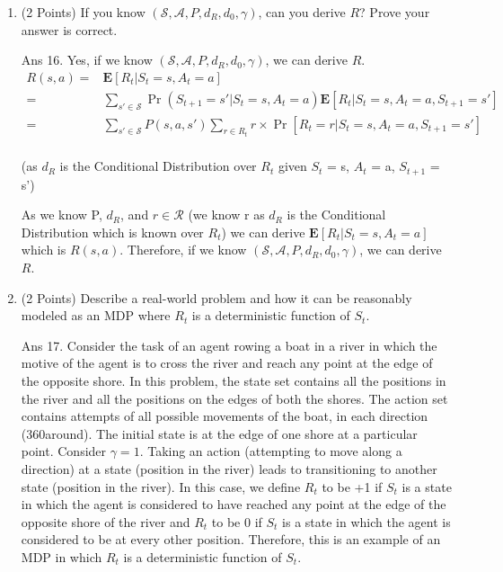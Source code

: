 \documentclass[]{article}
\begin{document}
\begin{enumerate}
    \item (2 Points) If you know $(\mathcal S, \mathcal A, P, d_R, d_0, \gamma)$, can you derive $R$? Prove your answer is correct. 

	{
		\color{blue}
		Ans 16. Yes, if we know $(\mathcal S, \mathcal A, P, d_R, d_0, \gamma)$, we can derive $R$.
			\begin{align}
		            R(s,a) =& \mathbf{E}[R_t|S_t=s,A_t=a] \\
		            =& \sum_{s' \in \mathcal S} \Pr(S_{t+1}=s'|S_t=s,A_t=a) \mathbf{E}[R_t|S_t=s,A_t=a, S_{t + 1} = s'] \\
		            =& \sum_{s' \in \mathcal S} P(s,a,s') \sum_{r \in R_t} r \times \Pr[R_t = r|S_t=s,A_t=a, S_{t + 1} = s'] \\
		        \end{align}
			\begin{flushright}
							(as $d_R$ is the Conditional Distribution over $R_t$ given $S_t$ = s, $A_t$ = a, $S_{t + 1}$ = s')
			\end{flushright}
			As we know P, $d_R$, and $r \in \mathcal R$ (we know r as $d_R$ is the Conditional Distribution which is known over $R_t$) we can derive $\mathbf{E}[R_t|S_t=s,A_t=a]$ which is $R(s, a)$. Therefore, if we know $(\mathcal S, \mathcal A, P, d_R, d_0, \gamma)$, we can derive $R$.
	}
    
    \item (2 Points) Describe a real-world problem and how it can be reasonably modeled as an MDP where $R_t$ is a deterministic function of $S_t$.

	{
		\color{blue}
			Ans 17. Consider the task of an agent rowing a boat in a river in which the motive of the agent is to cross the river and reach any point at the edge of the opposite shore. In this  problem, the state set contains all the positions in the river and all the positions on the edges of both the shores. The action set contains attempts of all possible movements of the boat, in each direction (360\degree around). The initial state is at the edge of one shore at a particular point. Consider $\gamma = 1$. Taking an action (attempting to move along a direction) at a state (position in the river) leads to transitioning to another state (position in the river). In this case, we define $R_{t}$ to be +1 if $S_{t}$ is a state in which the agent is  considered to have reached any point at the edge of the opposite shore of the river and $R_{t}$ to be 0 if $S_{t}$ is a state in which the agent is considered to be at every other position. Therefore, this is an example of an MDP in which $R_{t}$ is a deterministic function of $S_{t}$.
	}
    

\end{enumerate}
\end{document}
